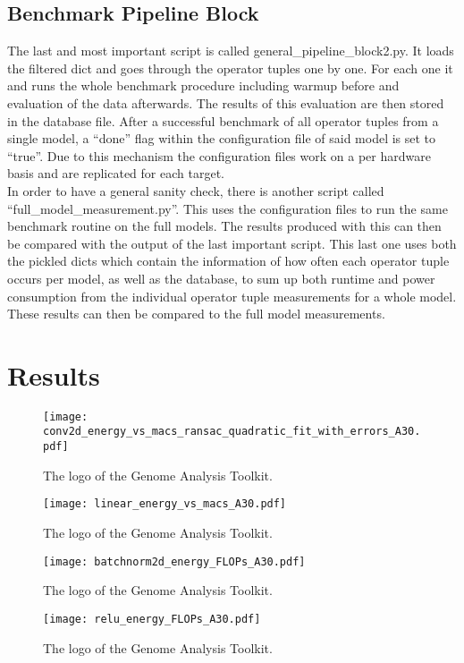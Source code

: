 \documentclass[conference]{IEEEtran}
\begin{document}
\subsection{Benchmark Pipeline Block}
The last and most important script is called general\_pipeline\_block2.py. It loads the filtered dict and goes through the operator tuples one by one. For each one it and runs the whole benchmark procedure including warmup before and evaluation of the data afterwards. The results of this evaluation are then stored in the database file. After a successful benchmark of all operator tuples from a single model, a “done” flag within the configuration file of said model is set to “true”. Due to this mechanism the configuration files work on a per hardware basis and are replicated for each target. \\
In order to have a general sanity check, there is another script called “full\_model\_measurement.py”. This uses the configuration files to run the same benchmark routine on the full models. The results produced with this can then be compared with the output of the last important script. This last one uses both the pickled dicts which contain the information of how often each operator tuple occurs per model, as well as the database, to sum up both runtime and power consumption from the individual operator tuple measurements for a whole model. These results can then be compared to the full model measurements.


\section{Results}

\begin{figure}
    \texttt{[image: conv2d\_energy\_vs\_macs\_ransac\_quadratic\_fit\_with\_errors\_A30.pdf]}
    \caption{The logo of the Genome Analysis Toolkit.}
    \label{fig:your_label}
    \texttt{[image: linear\_energy\_vs\_macs\_A30.pdf]}
    \caption{The logo of the Genome Analysis Toolkit.}
    \label{fig:your_label}
\end{figure}

\begin{figure}
    \texttt{[image: batchnorm2d\_energy\_FLOPs\_A30.pdf]}
    \caption{The logo of the Genome Analysis Toolkit.}
    \label{fig:your_label}
    \texttt{[image: relu\_energy\_FLOPs\_A30.pdf]}
    \caption{The logo of the Genome Analysis Toolkit.}
    \label{fig:your_label}
\end{figure}
\end{document}
